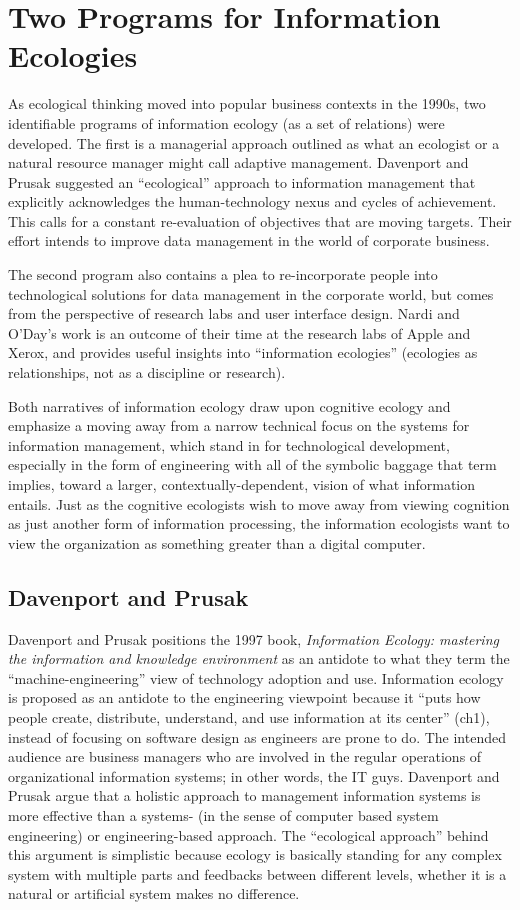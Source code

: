 \section{Two Programs for Information Ecologies}

As ecological thinking moved into popular business contexts in the 1990s, two identifiable programs of information ecology (as a set of relations) were developed. The first is a managerial approach outlined as what an ecologist or a natural resource manager might call adaptive management. Davenport and Prusak suggested an ``ecological'' approach to information management that explicitly acknowledges the human-technology nexus and cycles of achievement. This calls for a constant re-evaluation of objectives that are moving targets. Their effort intends to improve data management in the world of corporate business. 

The second program also contains a plea to re-incorporate people into technological solutions for data management in the corporate world, but comes from the perspective of research labs and user interface design. Nardi and O'Day's work is an outcome of their time at the research labs of Apple  and Xerox, and provides useful insights into ``information ecologies'' (ecologies as relationships, not as a discipline or research).

Both narratives of information ecology draw upon cognitive ecology and emphasize a moving away from a narrow technical focus on the systems for information management, which stand in for technological development, especially in the form of engineering with all of the symbolic baggage that term implies, toward a larger, contextually-dependent, vision of what information entails. Just as the cognitive ecologists wish to move away from viewing cognition as just another form of information processing, the information ecologists want to view the organization as something greater than a digital computer. 

\subsection{Davenport and Prusak}

Davenport and Prusak positions the 1997 book, \textit{Information Ecology: mastering the information and knowledge environment} as an antidote to what they term the ``machine-engineering'' view of technology adoption and use.  Information ecology is proposed as an antidote to the engineering viewpoint because it ``puts how people create, distribute, understand, and use information at its center'' (ch1), instead of focusing on software design as engineers are prone to do. The intended audience are business managers who are involved in the regular operations of organizational information systems; in other words, the IT guys. Davenport and Prusak argue that a holistic approach to management information systems is more effective than a systems- (in the sense of computer based system engineering) or engineering-based approach. The ``ecological approach'' behind this argument is simplistic because ecology is basically standing for any complex system with multiple parts and feedbacks between different levels, whether it is a natural or artificial system makes no difference.

